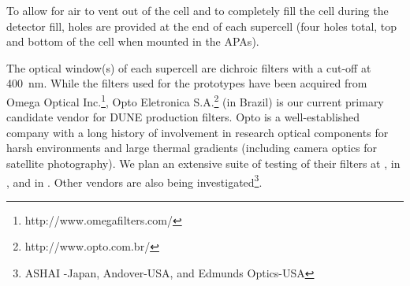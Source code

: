 
To allow for air to vent out of the cell and  to completely fill the cell during the detector fill, holes are provided at the end of each supercell (four holes total, top and bottom of the cell when mounted in the APAs).




The optical window(s) of each supercell are dichroic filters with a cut-off at \SI{400}{nm}. While the filters used for the  prototypes have been acquired from Omega Optical Inc.\footnote{http://www.omegafilters.com/}, Opto Eletronica S.A.\footnote{http://www.opto.com.br/} (in Brazil) is our current primary candidate vendor for DUNE production filters.  Opto is a well-established company with a long history of involvement in research optical components for harsh environments and large thermal gradients (including camera optics for satellite photography).  We plan an extensive suite of testing of their filters at , in , and in . Other vendors are also being investigated\footnote{ASHAI -Japan, Andover-USA, and Edmunds Optics-USA}.


   
